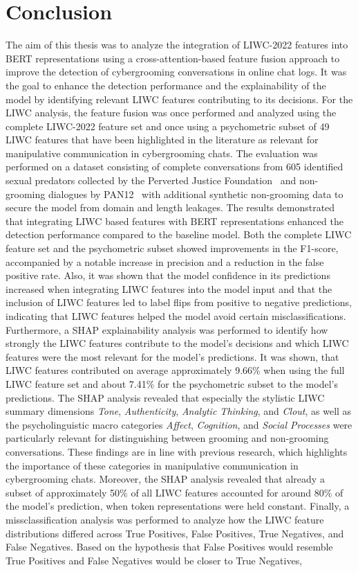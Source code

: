 \chapter{Conclusion}
The aim of this thesis was to analyze the integration of LIWC-2022 features into BERT representations using a cross-attention-based feature fusion approach to improve the detection of cybergrooming conversations in online chat logs. It was the goal to enhance the detection performance and the explainability of the model by identifying relevant LIWC features contributing to its decisions. For the LIWC analysis, the feature fusion was once performed and analyzed using the complete LIWC-2022 feature set and once using a psychometric subset of 49 LIWC features that have been highlighted in the literature as relevant for manipulative communication in cybergrooming chats. The evaluation was performed on a dataset consisting of complete conversations from 605 identified sexual predators collected by the Perverted Justice Foundation~\cite{pj} and non-grooming dialogues by PAN12~\cite{inches2012pan} with additional synthetic non-grooming data to secure the model from domain and length leakages. The results demonstrated that integrating LIWC based features with BERT representations enhanced the detection performance compared to the baseline model. Both the complete LIWC feature set and the psychometric subset showed improvements in the F1-score, accompanied by a notable increase in precision and a reduction in the false positive rate. Also, it was shown that the model confidence in its predictions increased when integrating LIWC features into the model input and that the inclusion of LIWC features led to label flips from positive to negative predictions, indicating that LIWC features helped the model avoid certain misclassifications. Furthermore, a SHAP explainability analysis was performed to identify how strongly the LIWC features contribute to the model's decisions and which LIWC features were the most relevant for the model's predictions. It was shown, that LIWC features contributed on average approximately 9.66\% when using the full LIWC feature set and about 7.41\% for the psychometric subset to the model’s predictions. The SHAP analysis revealed that especially the stylistic LIWC summary dimensions \textit{Tone}, \textit{Authenticity}, \textit{Analytic Thinking}, and \textit{Clout}, as well as the psycholinguistic macro categories \textit{Affect}, \textit{Cognition}, and \textit{Social Processes} were particularly relevant for distinguishing between grooming and non-grooming conversations. These findings are in line with previous research, which highlights the importance of these categories in manipulative communication in cybergrooming chats. Moreover, the SHAP analysis revealed that already a subset of approximately 50\% of all LIWC features accounted for around 80\% of the model’s prediction, when token representations were held constant. Finally, a missclassification analysis was performed to analyze how the LIWC feature distributions differed across True Positives, False Positives, True Negatives, and False Negatives. Based on the hypothesis that False Positives would resemble True Positives and False Negatives would be closer to True Negatives, 